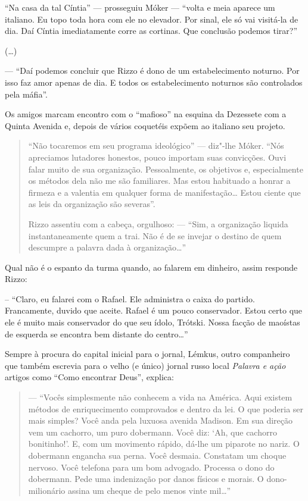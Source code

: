 {{{``Na casa da tal Cíntia'' --- prosseguiu Móker --- ``volta e meia aparece um italiano. Eu topo toda hora com ele no elevador. Por sinal, ele só vai visitá-la de dia. Daí Cíntia imediatamente corre as cortinas. Que conclusão podemos tirar?''

(\ldots{})

--- ``Daí podemos concluir que Rizzo é dono de um estabelecimento noturno. Por isso faz amor apenas de dia. E todos os estabelecimento noturnos são controlados pela máfia''.

Os amigos marcam encontro com o ``mafioso'' na esquina da Dezessete com a Quinta Avenida e, depois de vários coquetéis expõem ao italiano seu projeto.

\begin{quote}
``Não tocaremos em seu programa ideológico'' --- diz"-lhe Móker. ``Nós apreciamos lutadores honestos, pouco importam suas convicções. Ouvi falar muito de sua organização. Pessoalmente, os objetivos e, especialmente os métodos dela não me são familiares. Mas estou habituado a honrar a firmeza e a valentia em qualquer forma de manifestação\ldots{} Estou ciente que as leis da organização são severas''.

Rizzo assentiu com a cabeça, orgulhoso: --- ``Sim, a organização liquida instantaneamente quem a trai. Não é de se invejar o destino de quem descumpre a palavra dada à organização\ldots{}''
\end{quote}

Qual não é o espanto da turma quando, ao falarem em dinheiro, assim responde Rizzo:

-- ``Claro, eu falarei com o Rafael. Ele administra o caixa do partido. Francamente, duvido que aceite. Rafael é um pouco conservador. Estou certo que ele é muito mais conservador do que seu ídolo, Trótski. Nossa facção de maoístas de esquerda se encontra bem distante do centro\ldots{}''

Sempre à procura do capital inicial para o jornal, Lémkus, outro companheiro que também escrevia para o velho (e único) jornal russo local \emph{Palavra e ação} artigos como ``Como encontrar Deus'', explica:

\begin{quote}
--- ``Vocês simplesmente não conhecem a vida na América. Aqui existem métodos de enriquecimento comprovados e dentro da lei. O que poderia ser mais simples? Você anda pela luxuosa avenida Madison. Em sua direção vem um cachorro, um puro dobermann. Você diz: `Ah, que cachorro bonitinho!'. E, com um movimento rápido, dá-lhe um piparote no nariz. O dobermann engancha sua perna. Você desmaia. Constatam um choque nervoso. Você telefona para um bom advogado. Processa o dono do dobermann. Pede uma indenização por danos físicos e morais. O dono-milionário assina um cheque de pelo menos vinte mil\ldots{}''


\end{quote}}}}
